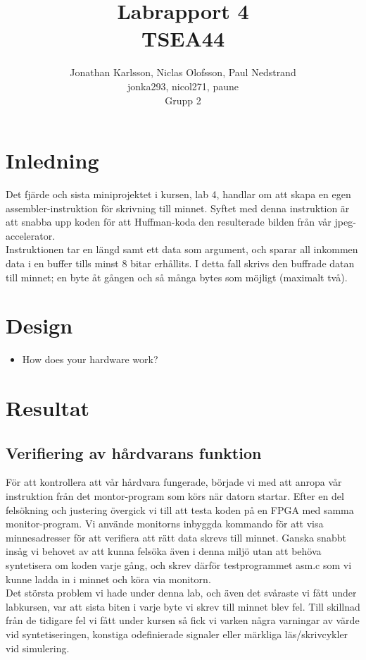 \documentclass[a4paper]{article}
\author{Jonathan Karlsson, Niclas Olofsson, Paul Nedstrand\\jonka293, nicol271, paune\\Grupp 2}
\title{Labrapport 4\\ \vspace{2 mm} {\large TSEA44}}
\begin{document}
\maketitle

\tableofcontents
\newpage

\section{Inledning}
Det fjärde och sista miniprojektet i kursen, lab 4, handlar om att skapa en egen assembler-instruktion
för skrivning till minnet. Syftet med denna instruktion är att snabba upp koden för att
Huffman-koda den resulterade bilden från vår jpeg-accelerator.\\

Instruktionen tar en längd samt ett data som argument, och sparar all inkommen data
i en buffer tills minst 8 bitar erhållits. I detta fall skrivs den buffrade datan till minnet;
en byte åt gången och så många bytes som möjligt (maximalt två).\\


\section{Design}
\begin{itemize}
\item How does your hardware work?
\end{itemize}

\section{Resultat}
\subsection{Verifiering av hårdvarans funktion}
För att kontrollera att vår hårdvara fungerade, började vi med att anropa vår instruktion från det
montor-program som körs när datorn startar. Efter en del felsökning och justering övergick vi till att testa
koden på en FPGA med samma monitor-program. Vi använde monitorns inbyggda kommando för att visa minnesadresser
för att verifiera att rätt data skrevs till minnet. Ganska snabbt insåg vi behovet av att kunna felsöka
även i denna miljö utan att behöva syntetisera om koden varje gång, och skrev därför testprogrammet asm.c
som vi kunne ladda in i minnet och köra via monitorn.\\

Det största problem vi hade under denna lab, och även det svåraste vi fått under labkursen,
var att sista biten i varje byte vi skrev till minnet blev fel. Till skillnad från de tidigare fel
vi fått under kursen så fick vi varken några varningar av värde vid syntetiseringen, konstiga
odefinierade signaler eller märkliga läs/skrivcykler vid simulering.\\
\end{document}
